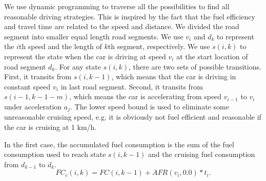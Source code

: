 
We use dynamic programming to traverse all the possibilities 
to find all reasonable driving strategies. 
This is inspired by the fact that the fuel efficiency and travel
time are related to the speed and distance. 
We divided the road segment into smaller equal length
road segments.  
We use $v_i$ and $d_k$ to represent the $i$th speed 
and the length of $k$th segment, respectively. 
We use $s(i, k)$ to represent the state when the car is driving
at speed $v_i$ at the start location of road segment $d_k$. 
For any state $s(i, k)$, there are two sets of possible transitions. 
First, it transits from $s(i, k - 1)$, which means that the
car is driving in constant speed $v_i$ in last road segment. 
Second, it transits from $s(i - 1, k - 1 - m)$, 
which means the car is accelerating from speed $v_{i - 1}$ to $v_i$
under acceleration $a_j$. The lower speed bound is used to eliminate
some unreasonable cruising speed, e.g. it is obviously not fuel efficient and 
reasonable if the car is cruising at 1 km/h.    

In the first case, the accumulated fuel consumption is the sum
of the fuel consumption used to reach state $s(i, k - 1)$ and 
the cruising fuel consumption from $d_{k - 1}$ to $d_k$. 
\begin{equation}
FC_c(i, k) = FC(i, k - 1) + AFR(v_i, 0.0) * t_i. 
\end{equation}

